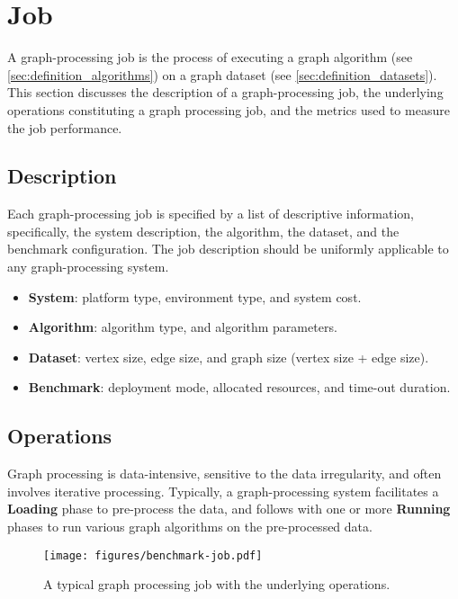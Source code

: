 \section{Job}
\label{sec:def:job}
A graph-processing job is the process of executing a graph algorithm (see \autoref{sec:definition_algorithms}) on a graph dataset (see \autoref{sec:definition_datasets}). This section discusses the description of a graph-processing job, the underlying operations constituting a graph processing job, and the metrics used to measure the job performance.

\subsection{Description}
Each graph-processing job is specified by a list of descriptive information, specifically, the system description, the algorithm, the dataset, and the benchmark configuration. The job description should be uniformly applicable to any graph-processing system.

\begin{itemize}
    \item \textbf{System}: platform type, environment type, and system cost.
    \item \textbf{Algorithm}: algorithm type, and algorithm parameters. 
    \item \textbf{Dataset}: vertex size, edge size, and graph size (vertex size + edge size).
    \item \textbf{Benchmark}: deployment mode, allocated resources, and time-out duration.
\end{itemize}


\subsection{Operations}
\label{sec:def:job:operation}
Graph processing is data-intensive, sensitive to the data irregularity, and often involves iterative processing. Typically, a graph-processing system facilitates a \textbf{Loading} phase to pre-process the data, and follows with one or more \textbf{Running} phases to run various graph algorithms on the pre-processed data.

\begin{figure}[h]
	\centering
	\texttt{[image: figures/benchmark-job.pdf]}
	\caption{A typical graph processing job with the underlying operations.}
	\label{fig:job}
\end{figure}


